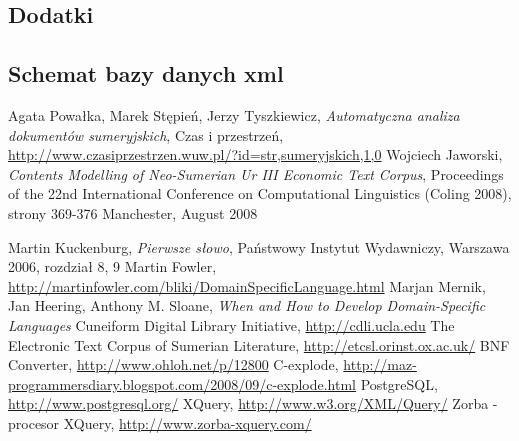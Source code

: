 \documentclass{pracamgr}
\begin{document}
\begin{appendix}
\chapter*{Dodatki}

\section*{Schemat bazy danych xml}
\label{appendix:xmlsch}





\end{appendix}

\begin{thebibliography}{99}
 Agata Powałka, Marek Stępień, Jerzy Tyszkiewicz, \textit{Automatyczna analiza dokumentów sumeryjskich}, 
Czas i przestrzeń, \url{http://www.czasiprzestrzen.wuw.pl/?id=str,sumeryjskich,1,0}
 Wojciech Jaworski, \textit{Contents Modelling of Neo-Sumerian Ur III Economic Text Corpus}, 
Proceedings of the 22nd International Conference on Computational Linguistics (Coling 2008), strony 369-376
Manchester, August 2008

 Martin Kuckenburg, \textit{Pierwsze słowo}, Państwowy Instytut Wydawniczy, Warszawa 2006, rozdział 8, 9
 Martin Fowler, \url{http://martinfowler.com/bliki/DomainSpecificLanguage.html}
 Marjan Mernik, Jan Heering, Anthony M. Sloane, \textit{When and How to Develop Domain-Specific Languages}
 Cuneiform Digital Library Initiative, \url{http://cdli.ucla.edu}
 The Electronic Text Corpus of Sumerian Literature, \url{http://etcsl.orinst.ox.ac.uk/}
 BNF Converter, \url{http://www.ohloh.net/p/12800} %
 C-explode, \url{http://maz-programmersdiary.blogspot.com/2008/09/c-explode.html}
 PostgreSQL, \url{http://www.postgresql.org/}
 XQuery, \url{http://www.w3.org/XML/Query/}
 Zorba - procesor XQuery, \url{http://www.zorba-xquery.com/}



\end{thebibliography}

\listoffigures
\end{document}
